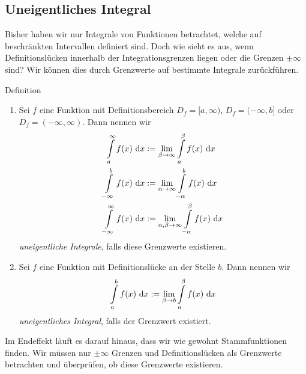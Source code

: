 \subsection{Uneigentliches Integral}
Bisher haben wir nur Integrale von Funktionen betrachtet, welche auf beschränkten Intervallen definiert sind.
Doch wie sieht es aus, wenn Definitionslücken innerhalb der Integrationsgrenzen liegen oder die Grenzen $\pm \infty$ sind?
Wir können dies durch Grenzwerte auf bestimmte Integrale zurückführen.\\
\begin{mybox}{Definition}
\begin{enumerate}
\item
Sei $f$ eine Funktion mit Definitionsbereich $D_f = [a,\infty)$, $D_f = (-\infty,b]$ oder $D_f = (-\infty, \infty)$.
Dann nennen wir 
\begin{align*}
\int\limits_a^\infty f(x) \ \text{\rmfamily d} x &:= \lim  \limits_{\beta \to \infty} \int\limits_a^\beta f(x) \ \text{\rmfamily d} x\\
\int\limits_{-\infty}^b f(x) \ \text{\rmfamily d} x &:= \lim \limits_{\alpha \to \infty} \int\limits_{-\alpha}^b f(x) \ \text{\rmfamily d} x\\
\int\limits_{-\infty}^{\infty} f(x) \ \text{\rmfamily d} x &:=\lim \limits_{\alpha,\beta \to \infty} \int\limits_{-\alpha}^\beta f(x) \ \text{\rmfamily d} x
\end{align*}
\textit{uneigentliche Integrale}, falls diese Grenzwerte existieren. 
\item
Sei $f$ eine Funktion mit Definitionslücke an der Stelle $b$.
Dann nennen wir
\begin{align*}
\int \limits_a^b f(x) \ \text{\rmfamily d} x := \lim \limits_{\beta \to b} \int \limits_a^\beta f(x) \ \text{\rmfamily d} x 
\end{align*}
\textit{uneigentliches Integral}, falls der Grenzwert existiert.
\end{enumerate}
\end{mybox}
Im Endeffekt läuft es darauf hinaus, dass wir wie gewohnt Stammfunktionen finden.
Wir müssen nur $\pm \infty$ Grenzen und Definitionslücken als Grenzwerte betrachten und überprüfen, ob diese Grenzwerte existieren.
